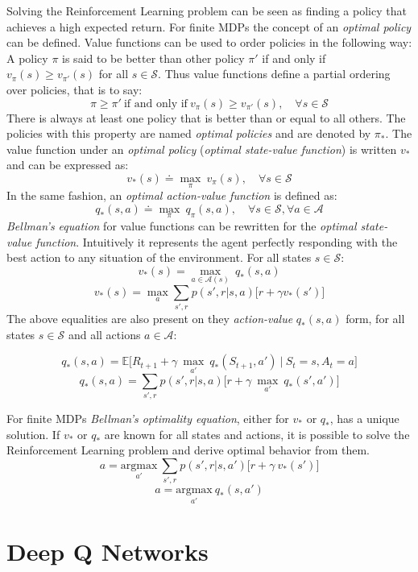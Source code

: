 \documentclass[
  12pt,
  openany]{book}
\begin{document}
Solving the Reinforcement Learning problem can be seen as finding a policy that achieves a high expected return. For finite MDPs the concept of an \emph{optimal policy} can be defined. Value functions can be used to order policies in the following way: A policy \(\pi\) is said to be better than other policy \(\pi'\) if and only if \(v_\pi(s) \geq v_{\pi'}(s)\) for all \(s \in \mathcal{S}\). Thus value functions define a partial ordering over policies, that is to say:
\[ \pi \geq \pi'\ \text{if and only if}\ v_\pi(s) \geq v_{\pi'}(s), \quad \forall s \in \mathcal{S}\]
There is always at least one policy that is better than or equal to all others. The policies with this property are named \emph{optimal policies} and are denoted by \(\pi_*\). The value function under an \emph{optimal policy} (\emph{optimal state-value function}) is written \(v_*\) and can be expressed as:
\[v_*(s) \doteq \underset {\pi} {\max}\ v_\pi(s), \quad \forall s \in \mathcal{S}\]
In the same fashion, an \emph{optimal action-value function} is defined as:
\[q_*(s,a) \doteq \underset {\pi} {\max}\ q_\pi(s,a), \quad \forall s \in \mathcal{S}, \forall a \in \mathcal{A}\]
\emph{Bellman's equation} for value functions
can be rewritten for the \emph{optimal state-value function}. Intuitively it represents the agent perfectly responding with the best action to any situation of the environment. For all states \(s \in \mathcal{S}\):
\[v_*(s) = \underset {a \in \mathcal{A}(s)} {\max}\ q_*(s,a)\]
\[v_*(s) = \underset{a} \max \sum_{s', r} p(s',r|s,a) \big[ r + \gamma v_*(s') \big]\]
The above equalities are also present on they \emph{action-value} \(q_*(s,a)\) form, for all states \(s \in \mathcal{S}\) and all actions \(a \in \mathcal{A}\):

\[q_*(s,a) = \mathds{E} \bigg[ R_{t+1} + \gamma\ \underset{a'} \max\ q_*(S_{t+1}, a')\ \bigg|\ S_t = s, A_t=a \bigg]\]
\[q_*(s,a) = \sum_{s',r} p(s',r|s,a) \bigg[ r + \gamma\ \underset{a'}{\max}\ q_*(s',a')\bigg]\]

For finite MDPs \emph{Bellman's optimality equation}, either for \(v_*\) or \(q_*\), has a unique solution. If \(v_*\) or \(q_*\) are known for all states and actions, it is possible to solve the Reinforcement Learning problem and derive optimal behavior from them.
\[a = \underset{a'}{\text{argmax}}\ \sum_{s',r} p(s',r|s,a') \big[ r + \gamma\ v_*(s') \big]\]
\[a = \underset{a'}{\text{argmax}}\ q_*(s,a')\]

\hypertarget{deep-q-networks}{%
\section{Deep Q Networks}\label{deep-q-networks}}
\end{document}
